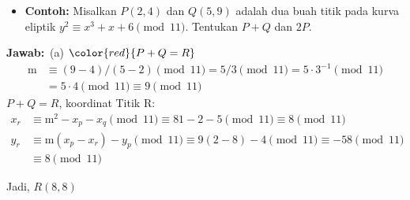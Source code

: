 \documentclass{article}
\begin{document}

\begin{itemize}
    \item \textbf{Contoh:} Misalkan $P(2, 4)$ dan $Q(5, 9)$ adalah dua buah titik pada kurva eliptik $y^2 \equiv x^3 + x + 6 \pmod{11}$. Tentukan $P + Q$ dan $2P$.
\end{itemize}

\textbf{Jawab:}\
(a) $\color{red}{P + Q = R}$
\[
\begin{aligned}
\text{m} & \equiv (9 - 4)/(5 - 2) \pmod{11} = 5/3 \pmod{11} = 5 \cdot 3^{-1} \pmod{11} \\
& = 5 \cdot 4 \pmod{11} \equiv 9 \pmod{11}
\end{aligned}
\]
$P + Q = R$, koordinat Titik R:
\[
\begin{aligned}
x_r & \equiv \text{m}^2 - x_p - x_q \pmod{11} \equiv 81 - 2 - 5 \pmod{11} \equiv 8 \pmod{11} \\
y_r & \equiv \text{m}(x_p - x_r) - y_p \pmod{11} \equiv 9(2 - 8) - 4 \pmod{11} \equiv -58 \pmod{11} \\
& \equiv 8 \pmod{11}
\end{aligned}
\]

Jadi, $R(8, 8)$
\end{document}

